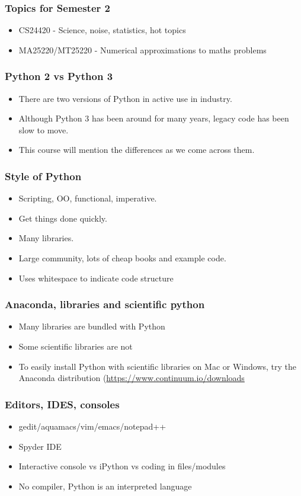 \documentclass{beamer}
\begin{document}
\begin{frame}
\frametitle{Topics for Semester 2}
\begin{itemize}
\item CS24420 - Science, noise, statistics, hot topics
\item MA25220/MT25220 - Numerical approximations to maths problems
\end{itemize}
\end{frame}




\begin{frame}
\frametitle{Python 2 vs Python 3}
\begin{itemize}
\item There are two versions of Python in active use in industry.
\item Although Python 3 has been around for many years, legacy code
  has been slow to move.
\item This course will mention the differences as we come across them.
\end{itemize}
\end{frame}

\begin{frame}
\frametitle{Style of Python}
\begin{itemize}
\item Scripting, OO, functional, imperative.
\item Get things done quickly.
\item Many libraries.
\item Large community, lots of cheap books and example code.
\item Uses whitespace to indicate code structure
\end{itemize}
\end{frame}

\begin{frame}
\frametitle{Anaconda, libraries and scientific python}
\begin{itemize}
\item Many libraries are bundled with Python
\item Some scientific libraries are not
\item To easily install Python with scientific libraries on Mac or Windows, try the
  Anaconda distribution (\url{https://www.continuum.io/downloads}
\end{itemize}
\end{frame}

\begin{frame}
\frametitle{Editors, IDES, consoles}
\begin{itemize}
\item gedit/aquamacs/vim/emacs/notepad++ 
\item Spyder IDE
\item Interactive console vs iPython vs coding in files/modules
\item No compiler, Python is an interpreted language
\end{itemize}
\end{frame}
\end{document}
